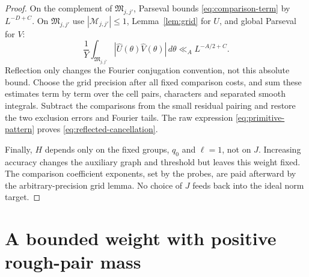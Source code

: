\documentclass[11pt]{article}
\theoremstyle{definition}
\theoremstyle{remark}
\begin{document}
\begin{proof}
On the complement of $\mathfrak M_{j,j'}$, Parseval bounds
\eqref{eq:comparison-term} by $L^{-D+C}$.
On $\mathfrak M_{j,j'}$ use $|\mathcal M_{j,j'}|\le1$,
Lemma~\ref{lem:grid} for $U$, and global Parseval for $V$:
\begin{equation}\label{eq:major-cauchy}
\frac1Y\int_{\mathfrak M_{j,j'}}
          |\widehat U(\theta)\widehat V(\theta)|\,d\theta
\ll_A L^{-A/2+C}.
\end{equation}
Reflection only changes the Fourier conjugation convention, not this
absolute bound. Choose the grid precision after all fixed comparison
costs, and sum these estimates term by term over the cell pairs,
characters and separated smooth integrals.
Subtract the comparisons from the small residual pairing and restore
the two exclusion errors and Fourier tails.
The raw expression \eqref{eq:primitive-pattern} proves
\eqref{eq:reflected-cancellation}.

Finally, $H$ depends only on the fixed groups, $q_0$ and $\ell=1$,
not on $J$. Increasing accuracy changes the auxiliary graph and
threshold but leaves this weight fixed.
The comparison coefficient exponents, set by the probes, are paid
afterward by the arbitrary-precision grid lemma.
No choice of $J$ feeds back into the ideal norm target.
\end{proof}

\section{A bounded weight with positive rough-pair mass}\label{sec:weight}
\end{document}
